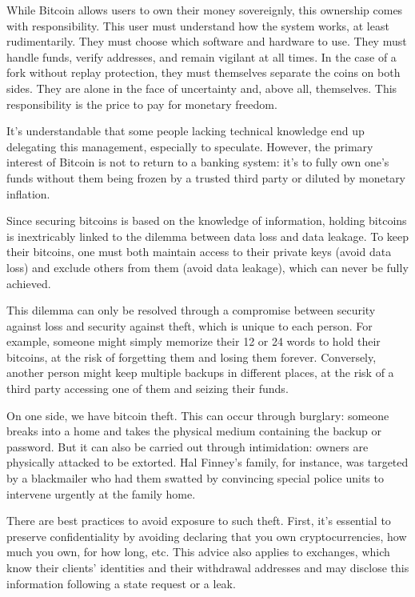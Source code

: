 \documentclass[
  a5paper,
  smalldemyvopaper,10pt,twoside,onecolumn,openright,extrafontsizes,hidelinks]{memoir}
\begin{document}

While Bitcoin allows users to own their money sovereignly, this
ownership comes with responsibility. This user must understand how the
system works, at least rudimentarily. They must choose which software
and hardware to use. They must handle funds, verify addresses, and
remain vigilant at all times. In the case of a fork without replay
protection, they must themselves separate the coins on both sides. They
are alone in the face of uncertainty and, above all, themselves. This
responsibility is the price to pay for monetary freedom.

It's understandable that some people lacking technical knowledge end up
delegating this management, especially to speculate. However, the
primary interest of Bitcoin is not to return to a banking system: it's
to fully own one's funds without them being frozen by a trusted third
party or diluted by monetary inflation.

Since securing bitcoins is based on the knowledge of information,
holding bitcoins is inextricably linked to the dilemma between data loss
and data leakage. To keep their bitcoins, one must both maintain access
to their private keys (avoid data loss) and exclude others from them
(avoid data leakage), which can never be fully achieved.

This dilemma can only be resolved through a compromise between security
against loss and security against theft, which is unique to each person.
For example, someone might simply memorize their 12 or 24 words to hold
their bitcoins, at the risk of forgetting them and losing them forever.
Conversely, another person might keep multiple backups in different
places, at the risk of a third party accessing one of them and seizing
their funds.

On one side, we have bitcoin theft. This can occur through burglary:
someone breaks into a home and takes the physical medium containing the
backup or password. But it can also be carried out through intimidation:
owners are physically attacked to be extorted. Hal Finney's family, for
instance, was targeted by a blackmailer who had them swatted by
convincing special police units to intervene urgently at the family
home.

There are best practices to avoid exposure to such theft. First, it's
essential to preserve confidentiality by avoiding declaring that you own
cryptocurrencies, how much you own, for how long, etc. This advice also
applies to exchanges, which know their clients' identities and their
withdrawal addresses and may disclose this information following a state
request or a leak.
\end{document}
